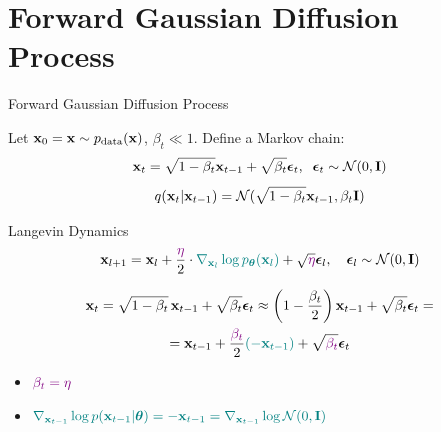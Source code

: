 \documentclass{beamer}
\begin{document}
\section{Forward Gaussian Diffusion Process}
\begin{frame}{Forward Gaussian Diffusion Process}

	Let $\mathbf{x}_0 = \mathbf{x} \sim p_{\text{data}}(\mathbf{x})$, $\beta_t \ll 1$. Define a Markov chain:
	\[
		\mathbf{x}_t = \sqrt{1 - \beta_t} \mathbf{x}_{t-1} + \sqrt{\beta_t} \boldsymbol{\epsilon}_t, \;\; \boldsymbol{\epsilon}_t \sim \mathcal{N}(0, \mathbf{I})
	\]
	\vspace{-0.5cm}
    \eqpause
	\[
		q(\mathbf{x}_t | \mathbf{x}_{t-1}) = \mathcal{N}(\sqrt{1 - \beta_t} \mathbf{x}_{t-1}, \beta_t \mathbf{I})
	\]
    \eqpause
	\vspace{-0.5cm}
	\begin{block}{Langevin Dynamics}
		\vspace{-0.3cm}
		\[
			\mathbf{x}_{l + 1} = \mathbf{x}_l + \frac{ \color{violet} \eta}{2} \cdot {\color{teal}\nabla_{\mathbf{x}_l} \log p_{\boldsymbol{\theta}}(\mathbf{x}_l)} + \sqrt{ \color{violet} \eta} \boldsymbol{\epsilon}_l, \quad \boldsymbol{\epsilon}_l \sim \mathcal{N}(0, \mathbf{I})
		\]
		\vspace{-0.5cm}
	\end{block}
    \eqpause
	\vspace{-0.7cm}
	\begin{multline*}
		\mathbf{x}_t = \sqrt{1 - \beta_t}\, \mathbf{x}_{t - 1} + \sqrt{\beta_t} \boldsymbol{\epsilon}_t \approx \left(1 - \frac{\beta_t}{2}\right)\mathbf{x}_{t-1} + \sqrt{\beta_t} \boldsymbol{\epsilon}_t = \\
		= \mathbf{x}_{t-1} + \frac{ \color{violet}  \beta_t}{2} {\color{teal} ( -\mathbf{x}_{t-1} )} + \sqrt{ \color{violet}  \beta_t} \boldsymbol{\epsilon}_t
	\end{multline*}
    \eqpause
	\vspace{-0.7cm}
	\begin{itemize}
		\item ${\color{violet} \beta_t = \eta }$
		\item ${\color{teal} \nabla_{\mathbf{x}_{t-1}}\log p(\mathbf{x}_{t-1} | \boldsymbol{\theta}) = - \mathbf{x}_{t-1} = \nabla_{\mathbf{x}_{t-1}} \log \mathcal{N}(0, \mathbf{I})}$
	\end{itemize}
 \end{frame}
\end{document}
